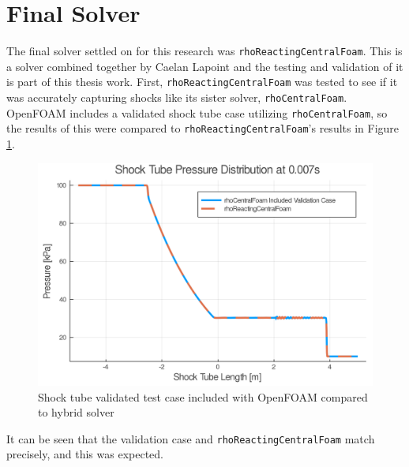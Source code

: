 

\section{Final Solver}

The final solver settled on for this research was \verb|rhoReactingCentralFoam|. This is a solver combined together by Caelan Lapoint and the testing and validation of it is part of this thesis work. First, \verb|rhoReactingCentralFoam| was tested to see if it was accurately capturing shocks like its sister solver, \verb|rhoCentralFoam|. OpenFOAM includes a validated shock tube case utilizing \verb|rhoCentralFoam|, so the results of this were compared to \verb|rhoReactingCentralFoam|'s results in Figure \ref{fig:sod}. 
\begin{figure}[H]
\centering
\includegraphics[width=0.85\linewidth]{./figs/shocktube.png} 
\caption{Shock tube validated test case included with OpenFOAM compared to hybrid solver}
\label{fig:sod}
\end{figure}%
\noindent It can be seen that the validation case and \verb|rhoReactingCentralFoam| match precisely, and this was expected. 



